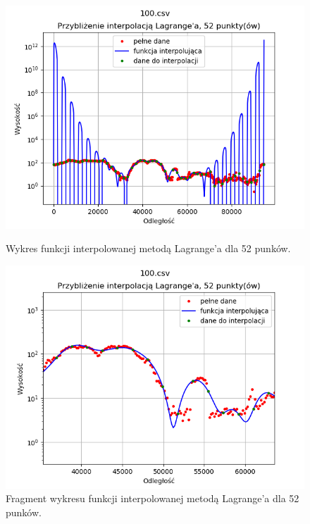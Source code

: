 \documentclass{article} %
\begin{document}
\begin{figure}[h!]
\begin{minipage}[b]{0.4\textwidth}
        \includegraphics[width=\textwidth]{lagrange/rozna_dokladnosc/100_52_cale.png}
        \caption{Wykres funkcji interpolowanej metodą Lagrange'a dla 52 punków.}
    \end{minipage}
    \hfill
    \begin{minipage}[b]{0.4\textwidth}
        \includegraphics[width=\textwidth]{lagrange/rozna_dokladnosc/100_52_zb.png}
        \caption{Fragment wykresu funkcji interpolowanej metodą Lagrange'a dla 52 punków.}
    \end{minipage}
\end{figure}
\newpage
\end{document}
